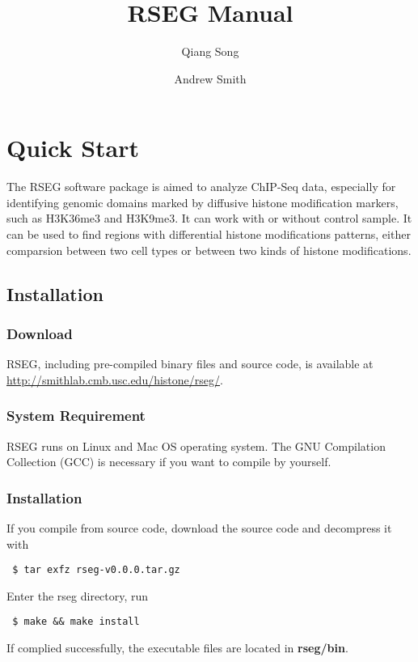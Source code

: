 \documentclass[11pt]{report}
\title{RSEG Manual}
\author{Qiang Song \and Andrew Smith}
\begin{document}
\maketitle

\chapter{Quick Start}
\label{chap:quick-start}

The RSEG software package is aimed to analyze ChIP-Seq data,
especially for identifying genomic domains marked by diffusive histone
modification markers, such as H3K36me3 and H3K9me3. It can work with
or without control sample. It can be used to find regions with
differential histone modifications patterns, either comparsion between
two cell types or between two kinds of histone modifications.

\section{Installation}
\label{sec:install}

\subsection*{Download}

RSEG, including pre-compiled binary files and source code, is
available at \url{http://smithlab.cmb.usc.edu/histone/rseg/}.

\subsection*{System Requirement}

RSEG runs on Linux and Mac OS operating system. The GNU Compilation
Collection (GCC) is necessary if you want to compile by yourself.

\subsection*{Installation}

If you compile from source code, download the source code and
decompress it with
\begin{verbatim}
 $ tar exfz rseg-v0.0.0.tar.gz
\end{verbatim}
%
Enter the rseg directory, run
\begin{verbatim}
 $ make && make install
\end{verbatim}
%
If complied successfully, the executable files are located in \textbf{rseg/bin}.
\end{document}
